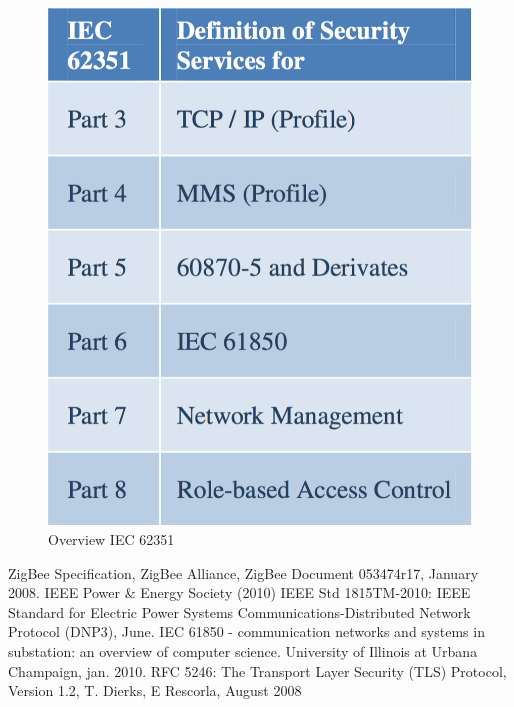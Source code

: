 \begin{figure}[h]
	\centering
	\includegraphics[scale=0.350]{imgs/62351.png}
	\caption{Overview IEC 62351} \label{fig:62351}
\end{figure}




\begin{thebibliography}{99}
 ZigBee Specification, ZigBee Alliance, ZigBee Document 053474r17, January 2008.
 IEEE Power \& Energy Society (2010) IEEE Std 1815TM-2010: IEEE Standard for Electric Power Systems Communications-Distributed Network Protocol (DNP3), June.
 IEC 61850 - communication networks and systems in substation: an overview of computer science.
University of Illinois at Urbana Champaign, jan. 2010. %
 RFC 5246: The Transport Layer Security (TLS) Protocol, Version 1.2, T. Dierks, E Rescorla, August 2008
\end{thebibliography}